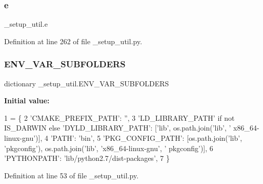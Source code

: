 \subsubsection{\texorpdfstring{e}{e}}
{\footnotesize\ttfamily \+\_\+setup\+\_\+util.\+e}



Definition at line 262 of file \+\_\+setup\+\_\+util.\+py.

\mbox{\label{namespace__setup__util_aa31804f1be8660156ce9394b33c68dc4}} 
\subsubsection{\texorpdfstring{E\+N\+V\+\_\+\+V\+A\+R\+\_\+\+S\+U\+B\+F\+O\+L\+D\+E\+RS}{ENV\_VAR\_SUBFOLDERS}}
{\footnotesize\ttfamily dictionary \+\_\+setup\+\_\+util.\+E\+N\+V\+\_\+\+V\+A\+R\+\_\+\+S\+U\+B\+F\+O\+L\+D\+E\+RS}

{\bfseries Initial value\+:}
\begin{DoxyCode}
1 =  \{
2     \textcolor{stringliteral}{'CMAKE\_PREFIX\_PATH'}: \textcolor{stringliteral}{''},
3     \textcolor{stringliteral}{'LD\_LIBRARY\_PATH'} \textcolor{keywordflow}{if} \textcolor{keywordflow}{not} IS\_DARWIN \textcolor{keywordflow}{else} \textcolor{stringliteral}{'DYLD\_LIBRARY\_PATH'}: [\textcolor{stringliteral}{'lib'}, os.path.join(\textcolor{stringliteral}{'lib'}, \textcolor{stringliteral}{'
      x86\_64-linux-gnu'})],
4     \textcolor{stringliteral}{'PATH'}: \textcolor{stringliteral}{'bin'},
5     \textcolor{stringliteral}{'PKG\_CONFIG\_PATH'}: [os.path.join(\textcolor{stringliteral}{'lib'}, \textcolor{stringliteral}{'pkgconfig'}), os.path.join(\textcolor{stringliteral}{'lib'}, \textcolor{stringliteral}{'x86\_64-linux-gnu'}, \textcolor{stringliteral}{'
      pkgconfig'})],
6     \textcolor{stringliteral}{'PYTHONPATH'}: \textcolor{stringliteral}{'lib/python2.7/dist-packages'},
7 \}
\end{DoxyCode}


Definition at line 53 of file \+\_\+setup\+\_\+util.\+py.

\mbox{\label{namespace__setup__util_a9a935bdd9ee1aa0327161025bb18c136}} 
